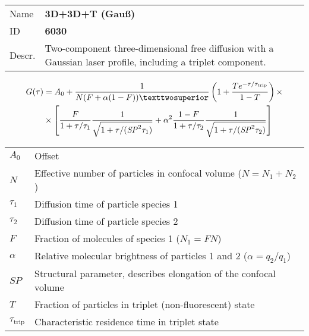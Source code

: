 \noindent \begin{tabular}{lp{}}
Name & \textbf{3D+3D+T (Gauß)} \\ 
ID & \textbf{6030} \\ 
Descr. &  Two-component three-dimensional free diffusion with a Gaussian laser profile, including a triplet component. \\ 
\end{tabular}
\begin{align}
G(\tau) &= A_0 + \frac{1}{N (F + \alpha (1-F))²}  \left(1 + \frac{T e^{-\tau/\tau_\mathrm{trip}}}{1-T}  \right)  \times \\
\notag &\times  \left[ \frac{F}{1+\tau/\tau_1}  \frac{1}{\sqrt{1+\tau/(\mathit{SP}^2 \tau_1)}} + \alpha^2 \frac{1-F}{ 1+\tau/\tau_2 }  \frac{1}{\sqrt{1+\tau/(\mathit{SP}^2 \tau_2)}} \right]
\end{align} 
\begin{center}
\begin{tabular}{ll}
$A_0$ & Offset \\ 
$N$ & Effective number of particles in confocal volume ($N = N_1+N_2$) \\ 
$\tau_1$ &  Diffusion time of particle species 1 \\ 
$\tau_2$ &  Diffusion time of particle species 2 \\ 
$F$ & Fraction of molecules of species 1 ($N_1 = F N$) \\
$\alpha$ & Relative molecular brightness of particles 1 and 2 ($ \alpha = q_2/q_1$) \\
$\mathit{SP}$ & Structural parameter, describes elongation of the confocal volume \\
$T$ &  Fraction of particles in triplet (non-fluorescent) state\\ 
$\tau_\mathrm{trip}$ &  Characteristic residence time in triplet state \\ 
\end{tabular}
\end{center}
\vspace{2em}



